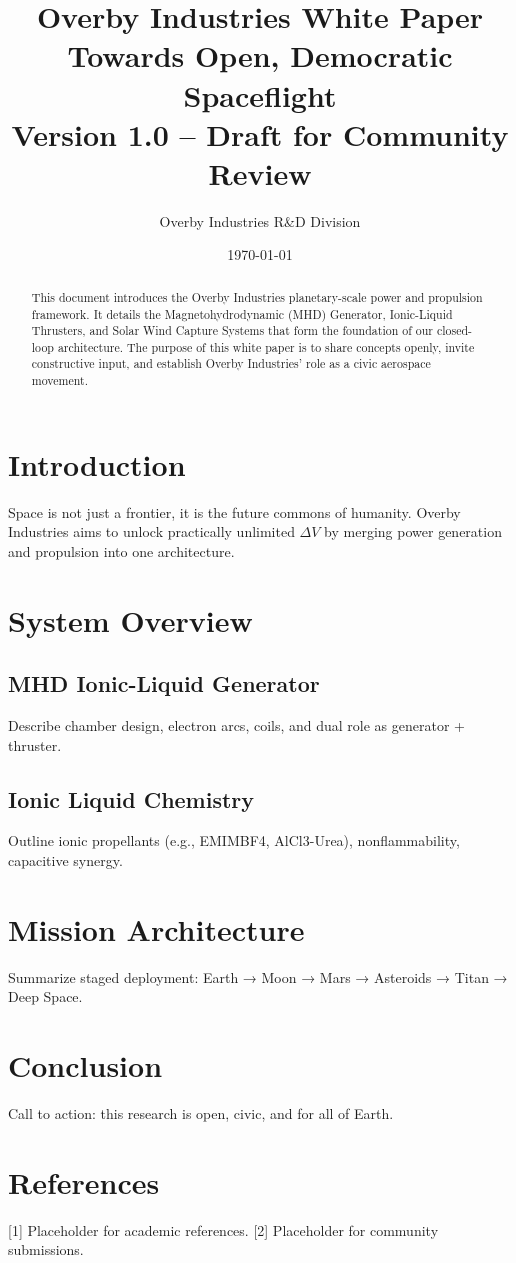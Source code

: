 \documentclass[12pt]{article}
\title{
    \Huge \textbf{Overby Industries White Paper} \\[0.5em]
    \Large Towards Open, Democratic Spaceflight \\[1em]
    {\large Version 1.0 – Draft for Community Review}
}
\author{Overby Industries R\&D Division}
\date{\today}
\begin{document}
\maketitle
\thispagestyle{empty}

\begin{abstract}
This document introduces the Overby Industries planetary-scale power and propulsion framework. It details the Magnetohydrodynamic (MHD) Generator, Ionic-Liquid Thrusters, and Solar Wind Capture Systems that form the foundation of our closed-loop architecture. The purpose of this white paper is to share concepts openly, invite constructive input, and establish Overby Industries’ role as a civic aerospace movement.
\end{abstract}

\newpage
\tableofcontents
\newpage

\section{Introduction}
Space is not just a frontier, it is the future commons of humanity. Overby Industries aims to unlock practically unlimited $\Delta V$ by merging power generation and propulsion into one architecture.

\section{System Overview}
\subsection{MHD Ionic-Liquid Generator}
Describe chamber design, electron arcs, coils, and dual role as generator + thruster.

\subsection{Ionic Liquid Chemistry}
Outline ionic propellants (e.g., EMIMBF4, AlCl3-Urea), nonflammability, capacitive synergy.

\section{Mission Architecture}
Summarize staged deployment: Earth → Moon → Mars → Asteroids → Titan → Deep Space.

\section{Conclusion}
Call to action: this research is open, civic, and for all of Earth.

\section{References}
[1] Placeholder for academic references.  
[2] Placeholder for community submissions.
\end{document}
